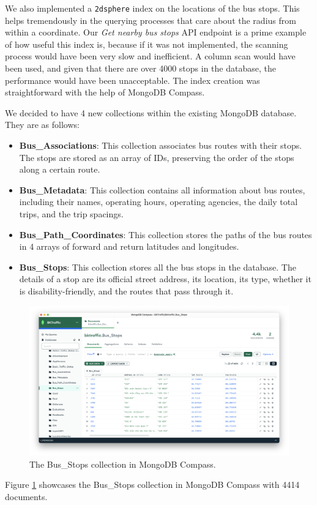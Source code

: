 We also implemented a \lstinline{2dsphere} index on the locations of the bus stops. This helps tremendously in the querying processes that care about the radius from within a coordinate. Our \textit{Get nearby bus stops} API endpoint is a prime example of how useful this index is, because if it was not implemented, the scanning process would have been very slow and inefficient. A column scan would have been used, and given that there are over 4000 stops in the database, the performance would have been unacceptable. The index creation was straightforward with the help of MongoDB Compass.

We decided to have 4 new collections within the existing MongoDB database. They are as follows:
\begin{itemize}
    \item \textbf{Bus\_Associations}: This collection associates bus routes with their stops. The stops are stored as an array of IDs, preserving the order of the stops along a certain route.
    \item \textbf{Bus\_Metadata}: This collection contains all information about bus routes, including their names, operating hours, operating agencies, the daily total trips, and the trip spacings.
    \item \textbf{Bus\_Path\_Coordinates}: This collection stores the paths of the bus routes in 4 arrays of forward and return latitudes and longitudes.
    \item \textbf{Bus\_Stops}: This collection stores all the bus stops in the database. The details of a stop are its official street address, its location, its type, whether it is disability-friendly, and the routes that pass through it.
\end{itemize}
\begin{figure}
    \centering
    \includegraphics[width=\textwidth]{assets/images/Implementation/db_compass.png}
    \caption{The Bus\_Stops collection in MongoDB Compass.}
    \label{fig:dbcompass}
\end{figure}
Figure \ref{fig:dbcompass} showcases the Bus\_Stops collection in MongoDB Compass with 4414 documents.

